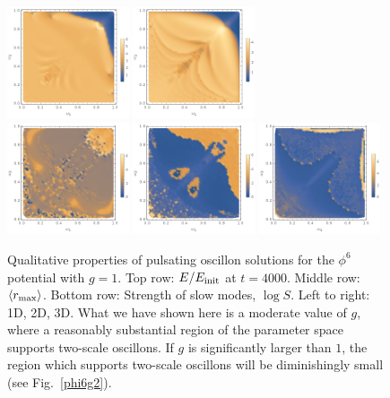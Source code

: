 \documentclass[%
reprint,
superscriptaddress,
amsmath,amssymb,
aps,
prd,
floatfix,
nofootinbib
]{revtex4-1}
\begin{document}
\begin{figure}
    \includegraphics[width=0.32\textwidth]{plot/r_max-phi6-2d.png}
    \includegraphics[width=0.32\textwidth]{plot/r_max-phi6-3d.png} \\
    \includegraphics[width=0.32\textwidth]{plot/slow-mode-logscale-phi6-1d.png}
    \includegraphics[width=0.32\textwidth]{plot/slow-mode-logscale-phi6-2d.png}
    \includegraphics[width=0.32\textwidth]{plot/slow-mode-logscale-phi6-3d.png}
    \caption{Qualitative properties of pulsating oscillon solutions for the $\phi^6$ potential with $g=1$. Top row: $E/E_{\rm init}$ at $t=4000$.
      Middle row: $\langle r_{\rm max}\rangle$.
      Bottom row: Strength of slow modes, $\log{S}$.\quad
      Left to right: 1D, 2D, 3D. \qquad What we have shown here is a moderate value of $g$, where a reasonably substantial region of the parameter space supports two-scale oscillons. If $g$ is significantly larger than $1$, the region which supports two-scale oscillons will be diminishingly small (see Fig.~\ref{phi6g2}).}\label{phi6}
\end{figure}
\end{document}
